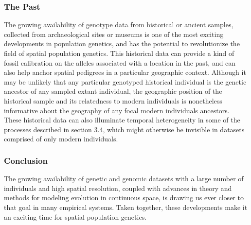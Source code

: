 \documentclass{ar-1col}
\newcommand{\g}[1]{{\color{blue}{#1}}}
\begin{document}
\subsubsection{The Past} 
The growing availability of genotype data from historical or ancient samples, 
collected from archaeological sites or museums 
is one of the most exciting developments in population genetics, 
and has the potential to revolutionize the field of spatial population genetics.
This historical data can provide a kind of fossil calibration on 
the alleles associated with a location in the past, 
and can also help anchor spatial pedigrees in a particular geographic context.
Although it may be unlikely that any particular genotyped historical individual 
is the genetic ancestor of any sampled extant individual, 
the geographic position of the historical sample and its 
relatedness to modern individuals is nonetheless informative 
about the geography of any focal modern individuals ancestors.
These historical data can also illuminate temporal heterogeneity 
in some of the processes described in section 3.4, 
which might otherwise be invisible in datasets comprised of only modern individuals.

\subsubsection{Conclusion}
\g{The field of spatial population genetics is the study of population genetics, in space. 
That is, the principal goals of population genetics -- 
to study patterns of genetic variation and 
learn about the processes generating those patterns 
-- are the same as those of spatial population genetics. 
However, spatial population genetics as a field 
is particularly concerned with the spatial context of these patterns, 
leveraging information in the position of samples 
to learn about processes governing 
the distribution of genetic diversity across landscapes. 
Spatial population genetics allows researchers to 
unite the quantitative descriptions of population genetics 
with fundamental questions about the ecology and evolution of organisms.}
The growing availability of genetic and genomic datasets 
with a large number of individuals and high spatial resolution, 
coupled with advances in theory and methods 
for modeling evolution in continuous space, 
is drawing us ever closer to that goal in many empirical systems.
Taken together, these developments make it 
an exciting time for spatial population genetics.
\end{document}
